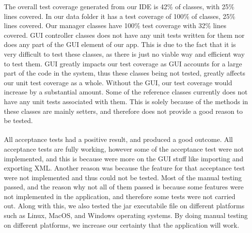 The overall test coverage generated from our IDE is 42\% of classes, with 25\% lines covered. In our data folder it has a test coverage of 100\% of classes, 25\% lines covered. Our manager classes have 100\% test coverage with 32\% lines covered. GUI controller classes does not have any unit tests written for them nor does any part of the GUI element of our app. This is due to the fact that it is very difficult to test these classes, as there is just no viable way and efficient way to test them. GUI greatly impacts our test coverage as GUI accounts for a large part of the code in the system, thus these classes being not tested, greatly affects our unit test coverage as a whole. Without the GUI, our test coverage would increase by a substantial amount. Some of the reference classes currently does not have any unit tests associated with them. This is solely because of the methods in these classes are mainly setters, and therefore does not provide a good reason to be tested. \\ \\All acceptance tests had a positive result, and produced a good outcome. All acceptance tests are fully working, however some of the acceptance test were not implemented, and this is because were more on the 
GUI stuff like importing and exporting XML. Another reason was because the feature for that acceptance test were not implemented and thus could not be tested. Most of the manual testing passed, and the reason why not all of them passed is because some features were not implemented in the application, and therefore some tests were not carried out. Along with this, we also tested the jar executabile file on different platforms such as Linux, MacOS, and Windows operating systems. By doing manual testing on different platforms, we increase our certainty that the application will work.\\